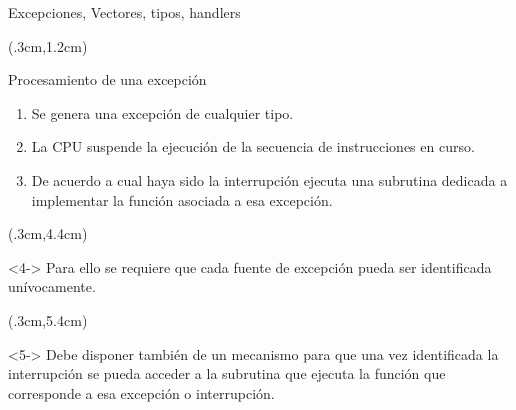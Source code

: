 \documentclass[table,x11names,aspectratio=169]{beamer}
\begin{document}
\begin{frame}{Excepciones, Vectores, tipos, handlers}
 \begin{textblock*}{\textwidth}(.3cm,1.2cm) 
  \begin{block}{Procesamiento de una excepción}
   \begin{enumerate}[<+->] \justifying
    \item Se genera una excepción de cualquier tipo.
    \item La CPU suspende la ejecución de la secuencia de instrucciones en curso.
    \item De acuerdo a cual haya sido la interrupción ejecuta una subrutina dedicada a implementar la función asociada a esa excepción.
    \end{enumerate}
   \end{block}
  \end{textblock*}
  \begin{textblock*}{\textwidth}(.3cm,4.4cm) 
   \begin{block}<4->{}\justifying
    Para ello se requiere que cada fuente de excepción pueda ser identificada unívocamente.
   \end{block}
  \end{textblock*}
  \begin{textblock*}{\textwidth}(.3cm,5.4cm) 
   \begin{block}<5->{} \justifying
    Debe disponer también de un mecanismo para que una vez identificada la interrupción se pueda acceder a la subrutina que ejecuta la función que corresponde a esa excepción o interrupción.
   \end{block}
  \end{textblock*}
\end{frame}
\end{document}
